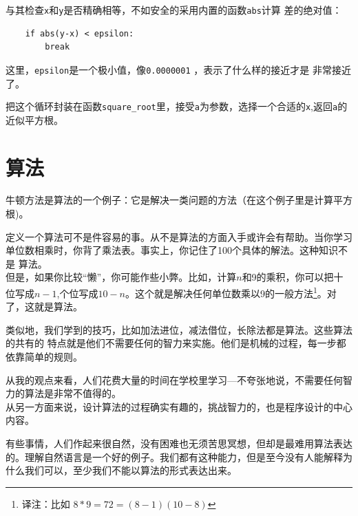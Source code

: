 
与其检查{\tt x}和{\tt y}是否精确相等，不如安全的采用内置的函数{\tt abs}计算
差的绝对值：

\beforeverb
\begin{verbatim}
    if abs(y-x) < epsilon:
        break
\end{verbatim}
\afterverb
%
这里，\verb"epsilon"是一个极小值，像{\tt 0.0000001} ，表示了什么样的接近才是
非常接近了。

\begin{ex}
\label{square_root}

把这个循环封装在函数\verb"square_root"里，接受{\tt a}为参数，选择一个合适的{\tt x},返回{\tt a}的近似平方根。
\end{ex}

\section{算法}

牛顿方法是算法的一个例子：它是解决一类问题的方法（在这个例子里是计算平方根)。

 定义一个算法可不是件容易的事。从不是算法的方面入手或许会有帮助。当你学习
 单位数相乘时，你背了乘法表。事实上，你记住了100个具体的解法。这种知识不是
 算法。\\

但是，如果你比较“懒”，你可能作些小弊。比如，计算$n$和9的乘积，你可以把十位写成$n-1$,个位写成$10-n$。这个就是解决任何单位数乘以9的一般方法\footnote{译注：比如
$8 * 9 = 72 = (8-1)(10-8)$}。对了，这就是算法。


类似地，我们学到的技巧，比如加法进位，减法借位，长除法都是算法。这些算法的共有的
特点就是他们不需要任何的智力来实施。他们是机械的过程，每一步都依靠简单的规则。

从我的观点来看，人们花费大量的时间在学校里学习---不夸张地说，不需要任何智力的算法是非常不值得的。\\

从另一方面来说，设计算法的过程确实有趣的，挑战智力的，也是程序设计的中心内容。

有些事情，人们作起来很自然，没有困难也无须苦思冥想，但却是最难用算法表达的。理解自然语言是一个好的例子。我们都有这种能力，但是至今没有人能解释为什么我们可以，至少我们不能以算法的形式表达出来。

